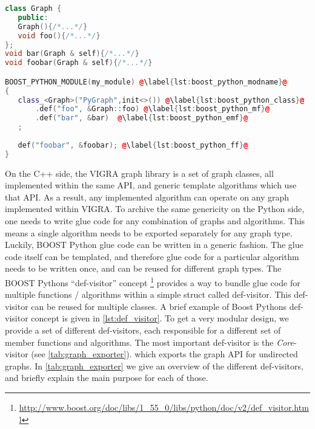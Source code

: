\vspace{0.3cm}
\begin{lstlisting}[language=c++]
class Graph {
   public:
   Graph(){/*...*/}
   void foo(){/*...*/}
};
void bar(Graph & self){/*...*/}
void foobar(Graph & self){/*...*/}

BOOST_PYTHON_MODULE(my_module) @\label{lst:boost_python_modname}@
{   
   class_<Graph>("PyGraph",init<>()) @\label{lst:boost_python_class}@
       .def("foo", &Graph::foo) @\label{lst:boost_python_mf}@
       .def("bar", &bar)  @\label{lst:boost_python_emf}@
   ;                                      
   
   def("foobar", &foobar); @\label{lst:boost_python_ff}@
}
\end{lstlisting}
\vspace{-1.4cm}

On the C++ side, the VIGRA graph library is a set of graph classes,
all implemented within the same API,
and generic template algorithms which use that API.
As a result, any implemented algorithm can operate on any graph
implemented within VIGRA.
To archive the same genericity on the Python side, one
needs to write glue code for any combination of graphs and algorithms.
This means a single algorithm needs to be exported separately for any
graph type. 
Luckily, BOOST Python glue code can be written in a generic fashion.
The glue code itself can be templated, and therefore 
glue code for a particular algorithm needs to be written once, 
and can be reused for different graph types.
The BOOST Pythons ``def-visitor'' concept \footnote{\url{http://www.boost.org/doc/libs/1_55_0/libs/python/doc/v2/def_visitor.html}}
provides a way to bundle glue code for multiple functions / algorithms within a simple struct called def-visitor.
This def-visitor can be reused for multiple classes.
A brief example of Boost Pythons def-visitor concept is given in \cref{lst:def_visitor}.
To get a very modular design, we provide a set of different def-visitors,
each responsible for a different set of member functions and algorithms.
The most important def-visitor is the \emph{Core}-visitor (see \cref{tab:graph_exporter}).
which exports the graph API for undirected graphs.
In \cref{tab:graph_exporter} we give an overview of 
the different def-visitors, and briefly explain the main purpose
for each of those.

